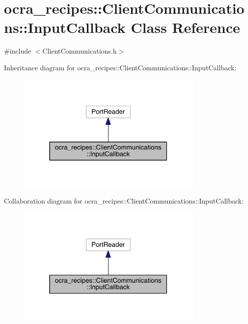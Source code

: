 \hypertarget{classocra__recipes_1_1ClientCommunications_1_1InputCallback}{}\section{ocra\+\_\+recipes\+:\+:Client\+Communications\+:\+:Input\+Callback Class Reference}
\label{classocra__recipes_1_1ClientCommunications_1_1InputCallback}


{\ttfamily \#include $<$Client\+Communications.\+h$>$}



Inheritance diagram for ocra\+\_\+recipes\+:\+:Client\+Communications\+:\+:Input\+Callback\+:\nopagebreak
\begin{figure}[H]
\begin{center}
\leavevmode
\includegraphics[width=259pt]{d7/daf/classocra__recipes_1_1ClientCommunications_1_1InputCallback__inherit__graph}
\end{center}
\end{figure}


Collaboration diagram for ocra\+\_\+recipes\+:\+:Client\+Communications\+:\+:Input\+Callback\+:\nopagebreak
\begin{figure}[H]
\begin{center}
\leavevmode
\includegraphics[width=259pt]{dd/d35/classocra__recipes_1_1ClientCommunications_1_1InputCallback__coll__graph}
\end{center}
\end{figure}
